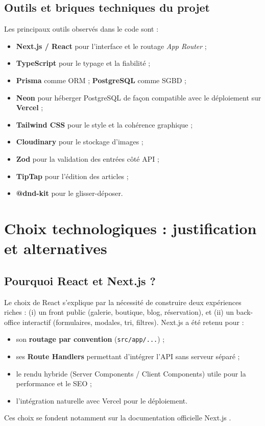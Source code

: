\subsection{Outils et briques techniques du projet}
Les principaux outils observés dans le code sont :
\begin{itemize}
    \item \textbf{Next.js / React} pour l’interface et le routage \textit{App Router} ;
    \item \textbf{TypeScript} pour le typage et la fiabilité ;
    \item \textbf{Prisma} comme ORM ; \textbf{PostgreSQL} comme SGBD ;
    \item \textbf{Neon} pour héberger PostgreSQL de façon compatible avec le déploiement sur \textbf{Vercel} ;
    \item \textbf{Tailwind CSS} pour le style et la cohérence graphique ;
    \item \textbf{Cloudinary} pour le stockage d’images ;
    \item \textbf{Zod} pour la validation des entrées côté API ;
    \item \textbf{TipTap} pour l’édition des articles ;
    \item \textbf{@dnd-kit} pour le glisser-déposer.
\end{itemize}

\section{Choix technologiques : justification et alternatives}

\subsection{Pourquoi React et Next.js ?}
Le choix de React s’explique par la nécessité de construire deux expériences riches :
(i) un front public (galerie, boutique, blog, réservation), et (ii) un back-office interactif (formulaires, modales, tri, filtres).
Next.js a été retenu pour :
\begin{itemize}
    \item son \textbf{routage par convention} (\texttt{src/app/...}) ;
    \item ses \textbf{Route Handlers} permettant d’intégrer l’API sans serveur séparé ;
    \item le rendu hybride (Server Components / Client Components) utile pour la performance et le SEO ;
    \item l’intégration naturelle avec Vercel pour le déploiement.
\end{itemize}
Ces choix se fondent notamment sur la documentation officielle Next.js \cite{nextjsDocs}.

